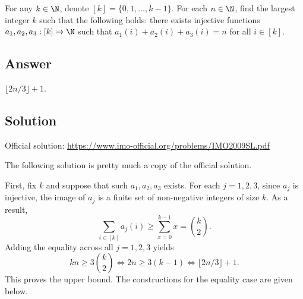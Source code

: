 For any $k \in \N$, denote $[k] = \{0, 1, \ldots, k - 1\}$.
For each $n \in \N$, find the largest integer $k$ such that the following holds: there exists injective functions $a_1, a_2, a_3 : [k] \to \N$ such that $a_1(i) + a_2(i) + a_3(i) = n$ for all $i \in [k]$.



\subsection*{Answer}

$\lfloor 2n/3 \rfloor + 1$.



\subsection*{Solution}

Official solution: \url{https://www.imo-official.org/problems/IMO2009SL.pdf}

The following solution is pretty much a copy of the official solution.

First, fix $k$ and suppose that such $a_1, a_2, a_3$ exists.
For each $j = 1, 2, 3$, since $a_j$ is injective, the image of $a_j$ is a finite set of non-negative integers of size $k$.
As a result,
\[ \sum_{i \in [k]} a_j(i) \geq \sum_{x = 0}^{k - 1} x = \binom{k}{2}. \]
Adding the equality across all $j = 1, 2, 3$ yields
\[ kn \geq 3 \binom{k}{2} \iff 2n \geq 3(k - 1) \iff \lfloor 2n/3 \rfloor + 1. \]
This proves the upper bound.
The constructions for the equality case are given below.

